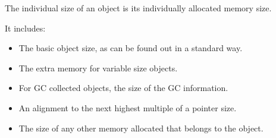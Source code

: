 {{{The individual size of an object is its individually allocated memory size. 
 \par}
{\par 
It includes:
 \par}
\begin{itemize}
\item  The basic object size, as can be found out in a standard way.\item  The extra memory for variable size objects.\item  For GC collected objects, the size of the GC information.\item  An alignment to the next highest multiple of a pointer size.\item  The size of any other memory allocated that belongs to the object.\end{itemize}
{\par 

}}}
